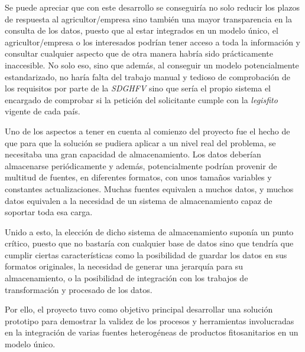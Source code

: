 Se puede apreciar que con este desarrollo se conseguiría no solo reducir los plazos de respuesta al agricultor/empresa sino también una mayor transparencia en la consulta de los datos, puesto que al estar integrados en un modelo único, el agricultor/empresa o los interesados podrían tener acceso a toda la información y consultar cualquier aspecto que de otra manera habría sido prácticamente inaccesible. No solo eso, sino que además, al conseguir un modelo potencialmente estandarizado, no haría falta del trabajo manual y tedioso de comprobación de los requisitos por parte de la \textit{SDGHFV} sino que sería el propio sistema el encargado de comprobar si la petición del solicitante cumple con la \textit{\gls{legisfito}} vigente de cada país. \par
Uno de los aspectos a tener en cuenta al comienzo del proyecto fue el hecho de que para que la solución se pudiera aplicar a un nivel real del problema, se necesitaba una gran capacidad de almacenamiento. Los datos deberían almacenarse periódicamente y además, potencialmente podrían provenir de multitud de fuentes, en diferentes formatos, con unos tamaños variables y constantes actualizaciones. Muchas fuentes equivalen a muchos datos, y muchos datos equivalen a la necesidad de un sistema de almacenamiento capaz de soportar toda esa carga. 
\par
Unido a esto, la elección de dicho sistema de almacenamiento suponía un punto crítico, puesto que no bastaría con cualquier base de datos sino que tendría que cumplir ciertas características como la posibilidad de guardar los datos en sus formatos originales, la necesidad de generar una jerarquía para su almacenamiento, o la posibilidad de integración con los trabajos de transformación y procesado de los datos. 
\par
Por ello, el proyecto tuvo como objetivo principal desarrollar una solución prototipo para demostrar la validez de los procesos y herramientas involucradas en la integración de varias fuentes heterogéneas de productos fitosanitarios en un modelo único.

